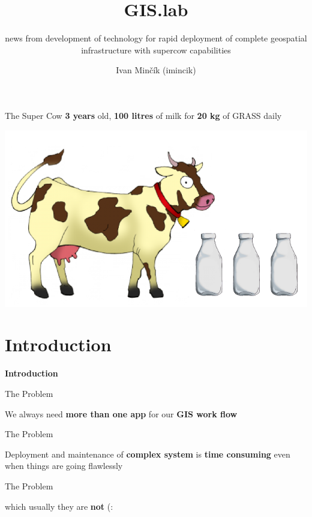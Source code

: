 \documentclass[12pt]{beamer}
\title{GIS.lab}
\subtitle{news from development of technology for rapid deployment of complete geospatial infrastructure with supercow capabilities}
\author{Ivan Minčík (imincik)}
\institute{FOSS4G Europe 2015, Como, Italy}
\date{}
\begin{document}
\begin{frame}
	\titlepage
\end{frame}

\begin{frame}{The Super Cow}
	\textbf{3 years} old, \textbf{100 litres} of milk for \textbf{20 kg} of GRASS daily
	\begin{center}
		\includegraphics[keepaspectratio=true,height=0.6\textheight]{images/cow.png}
	\end{center}
\end{frame}


\section{Introduction}
\begin{frame}
	\begin{center}
		\LARGE\textbf{Introduction}	
	\end{center}
\end{frame}

\begin{frame}{The Problem}
	\begin{center}
		We always need \textbf{more than one app} for our \textbf{GIS work flow}
	\end{center}
\end{frame}

\begin{frame}{The Problem}
	\begin{center}
		Deployment and maintenance of \textbf{complex system} is \textbf{time consuming} even when things are going flawlessly
		\end{center}
\end{frame}

\begin{frame}{The Problem}
	\begin{center}
		which usually they are \textbf{not} (:
	\end{center}
\end{frame}
\end{document}
